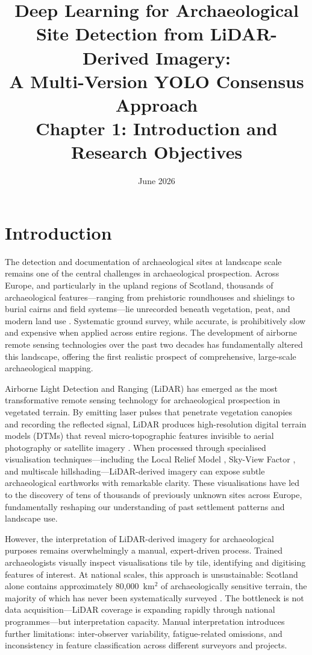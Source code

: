 \documentclass[12pt,a4paper]{article}
\title{\textbf{Deep Learning for Archaeological Site Detection from LiDAR-Derived Imagery: \\
A Multi-Version YOLO Consensus Approach}\\[6pt]
\large Chapter 1: Introduction and Research Objectives}
\author{}
\date{June 2026}
\begin{document}
\maketitle

\section{Introduction}

The detection and documentation of archaeological sites at landscape scale remains one of the
central challenges in archaeological prospection. Across Europe, and particularly in the upland
regions of Scotland, thousands of archaeological features---ranging from prehistoric roundhouses
and shielings to burial cairns and field systems---lie unrecorded beneath vegetation, peat, and
modern land use \citep{banaszek2018only}. Systematic ground survey, while accurate, is
prohibitively slow and expensive when applied across entire regions. The development of airborne
remote sensing technologies over the past two decades has fundamentally altered this landscape,
offering the first realistic prospect of comprehensive, large-scale archaeological mapping.

Airborne Light Detection and Ranging (LiDAR) has emerged as the most transformative remote
sensing technology for archaeological prospection in vegetated terrain. By emitting laser pulses
that penetrate vegetation canopies and recording the reflected signal, LiDAR produces
high-resolution digital terrain models (DTMs) that reveal micro-topographic features invisible to
aerial photography or satellite imagery \citep{crutchley2010light}. When processed through
specialised visualisation techniques---including the Local Relief Model \citep{hesse2010lidar},
Sky-View Factor \citep{kokalj2011application}, and multiscale hillshading---LiDAR-derived
imagery can expose subtle archaeological earthworks with remarkable clarity. These
visualisations have led to the discovery of tens of thousands of previously unknown sites across
Europe, fundamentally reshaping our understanding of past settlement patterns and landscape use.

However, the interpretation of LiDAR-derived imagery for archaeological purposes remains
overwhelmingly a manual, expert-driven process. Trained archaeologists visually inspect
visualisations tile by tile, identifying and digitising features of interest. At national scales,
this approach is unsustainable: Scotland alone contains approximately 80,000~km$^{2}$ of
archaeologically sensitive terrain, the majority of which has never been systematically
surveyed \citep{banaszek2018only}. The bottleneck is not data acquisition---LiDAR coverage is
expanding rapidly through national programmes---but interpretation capacity. Manual
interpretation introduces further limitations: inter-observer variability, fatigue-related
omissions, and inconsistency in feature classification across different surveyors and projects.
\end{document}

